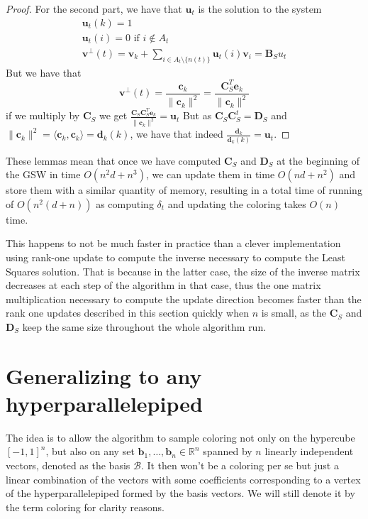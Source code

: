 \documentclass[12pt]{article}
\begin{document}
\begin{proof}
For the second part, we have that $\textbf{u}_t$ is the solution to the system \begin{align*}\textbf{u}_t(k) =1\\
            \textbf{u}_t(i) =0 \text{ if } i \notin A_t\\
            \textbf{v}^\perp(t) = \textbf{v}_{k} + \sum_{i \in A_t\setminus\{n(t)\}} \textbf{u}_t(i)\textbf{v}_i=\textbf{B}_Su_t\end{align*}
But we have that $$\textbf{v}^\perp(t)=\frac{\textbf{c}_k}{\|\textbf{c}_k\|^2}=\frac{\textbf{C}_S^T\textbf{e}_k}{\|\textbf{c}_k\|^2}$$
if we multiply by $\textbf{C}_S$ we get $\frac{\textbf{C}_S\textbf{C}_S^T\textbf{e}_k}{\|\textbf{c}_k\|^2}=\textbf{u}_t$ But as $\textbf{C}_S\textbf{C}_S^t=\textbf{D}_S$ and $\|\textbf{c}_k\|^2=\langle \textbf{c}_k,\textbf{c}_k\rangle=\textbf{d}_k(k)$, we have that indeed $\frac{\textbf{d}_k}{\textbf{d}_k(k)}=\textbf{u}_t$.
\end{proof}
These lemmas mean that once we have computed $\textbf{C}_S$ and $\textbf{D}_S$ at the beginning of the GSW in time $O(n^2d+n^3)$, we can update them in time $O(nd+n^2)$ and store them with a similar quantity of memory, resulting in a total time of running of $O(n^2(d+n))$ as computing $\delta_t$ and updating the coloring takes $O(n)$ time.

This happens to not be much faster in practice than a clever implementation using rank-one update to compute the inverse necessary to compute the Least Squares solution. That is because in the latter case, the size of the inverse matrix decreases at each step of the algorithm in that case, thus the one matrix multiplication necessary to compute the update direction becomes faster than the rank one updates described in this section quickly when $n$ is small, as the $\textbf{C}_S$ and $\textbf{D}_S$ keep the same size throughout the whole algorithm run.


\section{Generalizing to any hyperparallelepiped}
The idea is to allow the algorithm to sample coloring not only on the hypercube $[-1,1]^n$, but also on any set $\textbf{b}_1,\dots, \textbf{b}_n\in\mathbb{R}^n$ spanned by $n$ linearly independent vectors, denoted as the basis $\mathcal{B}$. It then won't be a coloring per se but just a linear combination of the vectors with some coefficients corresponding to a vertex of the hyperparallelepiped formed by the basis vectors. We will still denote it by the term coloring for clarity reasons.
\end{document}
